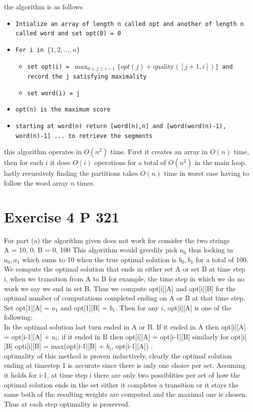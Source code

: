 \documentclass{amsart}
\begin{document}
the algorithm is as follows
{\small
    \begin{itemize}
        \item \texttt{Intialize an array of length n called opt and another of length n called word and set opt(0) = 0}
        \item \texttt{For i in $\{1,2,...,n\}$}
             \begin{itemize}
                 \item \texttt{set opt(i) = $\max_{0 \le j \le i-1}\{opt(j) + \text{quality}([j+1,i])\}$ and record the j satisfying maximality}
                 \item \texttt{set word(i) = j}
            \end{itemize}
        \item \texttt{opt(n) is the maximum score}
        \item \texttt{starting at word(n) return [word(n),n] and [word(word(n)-1), word(n)-1] ... to retrieve the segments}
    \end{itemize}
} 
this algorithm operates in $O(n^2)$
time. First it creates an array in $O(n)$ time, then for each $i$ it does $O(i)$ operations for a total of $O(n^2)$ in the 
main loop. lastly recursively finding the partitions takes $O(n)$ time in worst case having to follow the word array $n$ times.

\section{Exercise 4 P 321}
For part (a) the algorithm given does not work for consider the two strings\\
A = 10, 0; B = 0, 100
This algorithm would greedily pick $a_0$ thus locking in $a_0,a_1$ which sums to 10 when the true optimal solution is $b_0,b_1$ for a total of 100.
\\
We compute the optimal solution that ends in either set A or set B at time step i, when we transition from A to B for example, the time step in which we do no work
we say we end in set B. Thus we compute
opt[i][A] and opt[i][B] for the optimal number of computations completed ending on A or B at that time step. Set opt[1][A] = $a_1$ and opt[1][B] = $b_1$.
Then for any $i$, opt[i][A] is one of the following:\\
In the optimal solution last turn ended in A or B. If it ended in A then opt[i][A] = opt[i-1][A] + $a_i$, if it ended in B then opt[i][A] = opt[i-1][B]
similarly for opt[i][B]
opti[i][B] = max(opt[i-1][B] +  $b_i$, opt[i-1][A])
.\\
optimality of this method is proven inductively, clearly the optimal solution ending at timestep 1 is accurate since there is only one choice per set.
Assuming it holds for i-1, at time step i there are only two possiblities per set of how the optimal solution ends in the set either it completes a transition or it stays the same
both of the resulting weights are computed and the maximal one is chosen. Thus at each step optimality is preserved.
\end{document}

